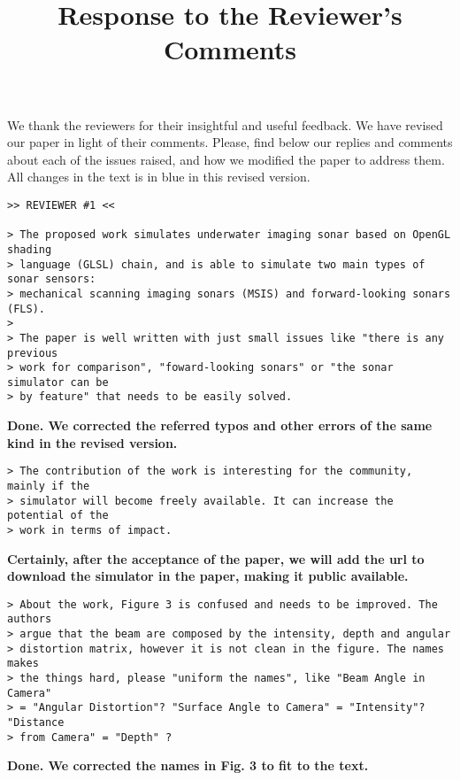 \documentclass{article}
\title{Response to the Reviewer's Comments}
\begin{document}
\maketitle

We thank the reviewers for their insightful and useful feedback. We have
revised our paper in light of their comments. Please, find 
below our replies and comments about each of the issues raised, and how
we modified the paper to address them. All changes in the text is in blue
in this revised version.

\begin{verbatim}
>> REVIEWER #1 <<

> The proposed work simulates underwater imaging sonar based on OpenGL shading
> language (GLSL) chain, and is able to simulate two main types of sonar sensors:
> mechanical scanning imaging sonars (MSIS) and forward-looking sonars (FLS).
>
> The paper is well written with just small issues like "there is any previous
> work for comparison", "foward-looking sonars" or "the sonar simulator can be
> by feature" that needs to be easily solved.
\end{verbatim}

\textbf{Done. We corrected the referred typos and other
errors of the same kind in the revised version.}

\begin{verbatim}
> The contribution of the work is interesting for the community, mainly if the
> simulator will become freely available. It can increase the potential of the
> work in terms of impact.
\end{verbatim}

\textbf{Certainly, after the acceptance of the paper, we will add the url to 
download the simulator in the paper, making it public available.}

\begin{verbatim}
> About the work, Figure 3 is confused and needs to be improved. The authors
> argue that the beam are composed by the intensity, depth and angular
> distortion matrix, however it is not clean in the figure. The names makes
> the things hard, please "uniform the names", like "Beam Angle in Camera"
> = "Angular Distortion"? "Surface Angle to Camera" = "Intensity"? "Distance
> from Camera" = "Depth" ?
\end{verbatim}

\textbf{Done. We corrected the names in Fig. 3 to fit to the text.}
\end{document}
